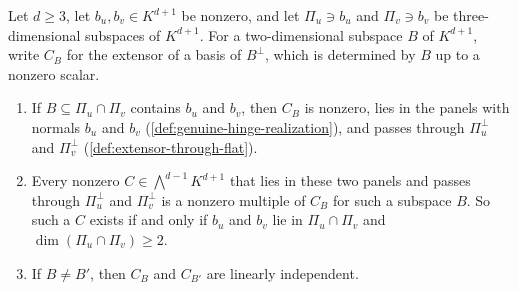 \begin{lemma}
  \label{lem:pencil-d-two-pencil-extension}
  \leanok
  Let $d \ge 3$, let $b_u, b_v \in K^{d+1}$ be nonzero, and let
  $\Pi_u \ni b_u$ and $\Pi_v \ni b_v$ be three-dimensional subspaces of
  $K^{d+1}$. For a two-dimensional subspace $B$ of $K^{d+1}$, write
  $C_B$ for the extensor of a basis of $B^{\perp}$, which is determined
  by $B$ up to a nonzero scalar.
  \begin{enumerate}
    \item If $B \subseteq \Pi_u \cap \Pi_v$ contains $b_u$ and $b_v$,
      then $C_B$ is nonzero, lies in the panels with normals $b_u$ and
      $b_v$ (\cref{def:genuine-hinge-realization}), and passes through
      $\Pi_u^{\perp}$ and $\Pi_v^{\perp}$
      (\cref{def:extensor-through-flat}).
    \item Every nonzero $C \in \bigwedge^{d-1} K^{d+1}$ that lies in
      these two panels and passes through $\Pi_u^{\perp}$ and
      $\Pi_v^{\perp}$ is a nonzero multiple of $C_B$ for such a subspace
      $B$. So such a $C$ exists if and only if $b_u$ and $b_v$ lie in
      $\Pi_u \cap \Pi_v$ and $\dim(\Pi_u \cap \Pi_v) \ge 2$.
    \item If $B \neq B'$, then $C_B$ and $C_{B'}$ are linearly
      independent.
  \end{enumerate}
\end{lemma}
